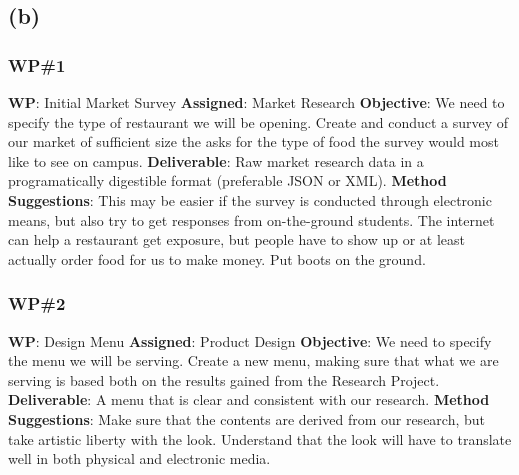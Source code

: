 \documentclass{article}
\begin{document}
	\subsection*{\quad(b)}
	\subsubsection*{WP\#1}
		\textbf{WP}: Initial Market Survey\newline
		\textbf{Assigned}: Market Research\newline
		\textbf{Objective}: We need to specify the type of restaurant we will be opening. Create and conduct a survey of our market of sufficient size the asks for the type of food the survey would most like to see on campus.\newline
		\textbf{Deliverable}: Raw market research data in a programatically digestible format (preferable JSON or XML).\newline
		\textbf{Method Suggestions}: This may be easier if the survey is conducted through electronic means, but also try to get responses from on-the-ground students. The internet can help a restaurant get exposure, but people 			have to show up or at least actually order food for us to make money. Put boots on the ground.\newline
	\subsubsection*{WP\#2}
		\textbf{WP}: Design Menu\newline
		\textbf{Assigned}: Product Design\newline
		\textbf{Objective}: We need to specify the menu we will be serving. Create a new menu, making sure that what we are serving is based both on the results gained from the Research Project.\newline
		\textbf{Deliverable}: A menu that is clear and consistent with our research.\newline
		\textbf{Method Suggestions}: Make sure that the contents are derived from our research, but take artistic liberty with the look. Understand that the look will have to translate well in both physical and electronic media.\newline
\end{document}
